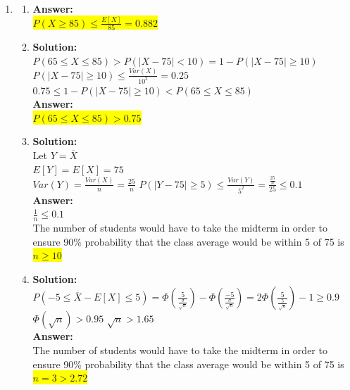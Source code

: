 \documentclass{article}
\newcommand{\myansw}{\textbf{Answer:}\\}
\newcommand{\mysolu}{\textbf{Solution:}\\}
\begin{document}
\begin{enumerate}
	
	\item
	\begin{enumerate}
		\item
		\myansw 
		\colorbox{yellow}{$P(X \geq 85) \leq \frac{E[X]}{85} = 0.882$}\\
		\item 
		\mysolu
		$P (65 \leq X \leq 85) > P(|X - 75|< 10) = 1 - P(|X - 75|\geq 10)$\\
		$P(|X - 75| \geq 10) \leq \frac{Var(X)}{10^2} = 0.25$\\
		$0.75 \leq 1 - P(|X - 75|\geq 10)< P (65 \leq X \leq 85) $\\
		\myansw
		\colorbox{yellow}{$ P (65 \leq X \leq 85) > 0.75$}\\
		\item
		\mysolu
		Let $Y = \overline{X}$\\
		$E[Y] = E[X] = 75$\\
		$Var(Y) = \frac{Var(X)}{n} = \frac{25}{n}$
		$P(|Y - 75| \geq 5) \leq \frac{Var(Y)}{5^2} = \frac{\frac{25}{n}}{25}\leq 0.1$\\
		\myansw
		$\frac{1}{n}\leq 0.1$\\
		The number of students would have to take the midterm in order to ensure 90\% probability that the class average would be within 5 of 75 is\\
		\colorbox{yellow}{$n \geq 10$}\\
		\item
		\mysolu
		$P(-5 \leq \overline{X} - E[X] \leq 5) = \Phi(\frac{5}{\frac{\sigma}{\sqrt{n}}})-\Phi(\frac{-5}{\frac{\sigma}{\sqrt{n}}})= 2\Phi(\frac{5}{\frac{5}{\sqrt{n}}}) - 1 \geq 0.9$\\
		$\Phi(\sqrt{n})>0.95$
		$\sqrt{n}>1.65$\\
		\myansw
		The number of students would have to take the midterm in order to ensure 90\% probability that the class average would be within 5 of 75 is\\
		\colorbox{yellow}{$n =3>2.72 $}\\
		
		
		

\end{enumerate}
\end{enumerate}
\end{document}

